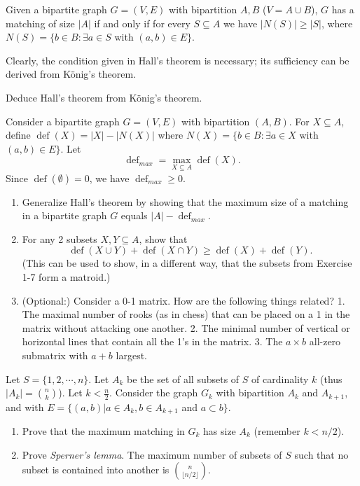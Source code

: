 \documentclass[12pt]{article}
\begin{document}
\begin{theorem}[Hall 1935]
Given a bipartite graph $G=(V,E)$ with bipartition $A,B$ ($V=A\cup
B$), $G$ has a matching of size $|A|$ if and only if for every
$S\subseteq A$ we have $|N(S)|\geq |S|$, where $N(S)=\{b\in B: \exists
a \in S$ with $(a,b)\in E\}$.
\end{theorem}

Clearly, the condition given in Hall's theorem is necessary; its
sufficiency can be derived from K\"onig's theorem.

\begin{exercises}
\item
Deduce Hall's theorem from K\"onig's theorem.\\
\item
Consider a bipartite graph $G=(V,E)$ with bipartition $(A,B)$. For
$X\subseteq A$, define $\operatorname{def}(X)=|X|-|N(X)|$ where $N(X)=\{b\in B:
\exists a\in X$ with $(a,b)\in E\}$. Let $$\operatorname{def}_{max}=
\max_{X\subseteq A} \operatorname{def}(X).$$ Since $\operatorname{def}(\emptyset)=0$, we have
$\operatorname{def}_{max}\geq 0$.  
\begin{enumerate}
\item
Generalize Hall's theorem by showing that the maximum size of a
matching in a bipartite graph $G$ equals $|A|-\operatorname{def}_{max}$. 
\item
For any 2 subsets $X, Y\subseteq A$, show that 
$$\operatorname{def}(X\cup Y) + \operatorname{def}(X\cap Y) \geq \operatorname{def}(X) + \operatorname{def}(Y).$$
(This can be used to show, in a different way, that the subsets from Exercise 1-7 form a matroid.)
\item (Optional:) Consider a 0-1 matrix. How are the following things related? 1. The maximal number of rooks (as in chess) that can be placed on a 1 in the matrix without attacking one another. 2. The minimal number of vertical or horizontal lines that contain all the 1's in the matrix. 3. The $a\times b$ all-zero submatrix with $a + b$ largest.
\end{enumerate}
\item
Let $S=\{1,2, \cdots, n\}$. Let $A_k$ be the set of all subsets of $S$ of cardinality $k$ (thus $|A_k|={n \choose k}$). Let $k<\frac{n}{2}$. Consider the graph $G_k$ with bipartition $A_k$ and $A_{k+1}$, and with $E=\{(a,b) | a\in A_k, b\in A_{k+1}$ and $a\subset b\}$. 
\begin{enumerate}
\item
Prove that the maximum matching in $G_k$ has size $A_k$ (remember $k<n/2$). 
\item
Prove {\it Sperner's lemma}. The maximum number of subsets of $S$ such that no subset is contained into another is ${n \choose {\lfloor n/2 \rfloor}}$.  
\end{enumerate}
\end{exercises}
\end{document}
